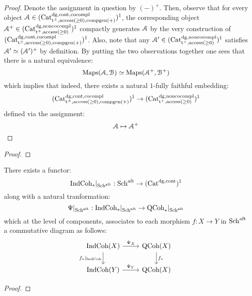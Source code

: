                     \begin{proof}
                        Denote the assignment in question by $(-)^+$. Then, observe that for every object $\mathcal{A} \in (\mathrm{Cat}^{\mathrm{dg}, \mathrm{cont}, \mathrm{co}\mathrm{compl}}_{\mathrm{t}^{\pm}, \mathrm{access}(\geq 0), \mathrm{comp}\mathrm{gen}(+)})^1$, the corresponding object $\mathcal{A}^+ \in (\mathrm{Cat}^{\mathrm{dg}, \mathrm{non}\mathrm{co}\mathrm{compl}}_{\mathrm{t}^+, \mathrm{access}(\geq 0)})^1$ compactly generates $\mathcal{A}$ by the very construction of $(\mathrm{Cat}^{\mathrm{dg}, \mathrm{cont}, \mathrm{co}\mathrm{compl}}_{\mathrm{t}^{\pm}, \mathrm{access}(\geq 0), \mathrm{comp}\mathrm{gen}(+)})^1$. Also, note that any $\mathcal{A}' \in (\mathrm{Cat}^{\mathrm{dg}, \mathrm{non}\mathrm{co}\mathrm{compl}}_{\mathrm{t}^+, \mathrm{access}(\geq 0)})^1$ satisfies $\mathcal{A}' \simeq (\mathcal{A}')^+$ by definition. By putting the two observations together one sees that there is a natural equivalence:
                            $$\mathrm{Maps}(\mathcal{A}, \mathcal{B}) \simeq \mathrm{Maps}(\mathcal{A}^+, \mathcal{B}^+)$$
                        which implies that indeed, there exists a natural $1$-fully faithful embedding:
                            $$(\mathrm{Cat}^{\mathrm{dg}, \mathrm{cont}, \mathrm{co}\mathrm{compl}}_{\mathrm{t}^{\pm}, \mathrm{access}(\geq 0), \mathrm{comp}\mathrm{gen}(+)})^1 \to (\mathrm{Cat}^{\mathrm{dg}, \mathrm{non}\mathrm{co}\mathrm{compl}}_{\mathrm{t}^+, \mathrm{access}(\geq 0)})^1$$
                        defined via the assignment:
                            $$\mathcal{A} \mapsto \mathcal{A}^+$$
                    \end{proof}
                \begin{lemma}
                    
                \end{lemma}
                    \begin{proof}
                        
                    \end{proof}
                \begin{theorem} \label{theorem: indcoh_functoriality}
                    There exists a functor:
                        $$\mathrm{Ind}\mathrm{Coh}_*|_{\mathrm{Sch}^{\mathrm{aft}}}: \mathrm{Sch}^{\mathrm{aft}} \to (\mathrm{Cat}^{\mathrm{dg}, \mathrm{cont}})^1$$
                    along with a natural tranformation:
                        $$\Psi|_{\mathrm{Sch}^{\mathrm{aft}}}: \mathrm{Ind}\mathrm{Coh}_*|_{\mathrm{Sch}^{\mathrm{aft}}} \to \mathrm{QCoh}_*|_{\mathrm{Sch}^{\mathrm{aft}}}$$
                    which at the level of components, associates to each morphism $f: X \to Y$ in $\mathrm{Sch}^{\mathrm{aft}}$ a commutative diagram as follows:
                        $$
                            \begin{tikzcd}
                            	{\Ind\Coh(X)} & {\QCoh(X)} \\
                            	{\Ind\Coh(Y)} & {\QCoh(X)}
                            	\arrow["{\Psi_X}", from=1-1, to=1-2]
                            	\arrow["{f_*|_{\Ind\Coh}}"', from=1-1, to=2-1]
                            	\arrow["{f_*}", from=1-2, to=2-2]
                            	\arrow["{\Psi_Y}", from=2-1, to=2-2]
                            \end{tikzcd}
                        $$
                \end{theorem}
                    \begin{proof}
                        
                    \end{proof}
    
